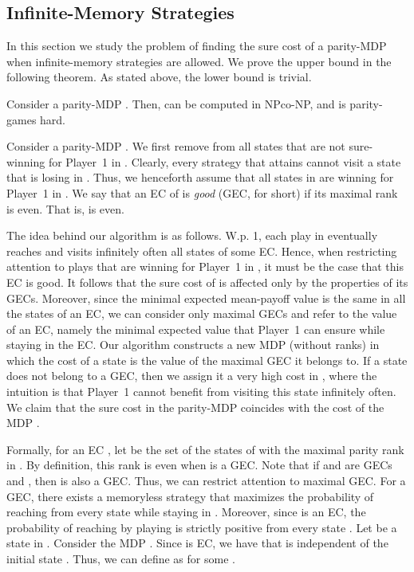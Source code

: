 \documentclass[runningheads,a4paper]{llncs}
\newcommand{\gec}{{GEC}\xspace}
\newcommand{\gecs}{{GECs}\xspace}
\begin{document}
\vspace*{-8pt}
\subsection{Infinite-Memory Strategies}
\label{sec:infinite memory}
In this section we study the problem of finding the sure cost of a parity-MDP when infinite-memory strategies are allowed. 
We prove the upper bound in the following theorem. As stated above, the lower bound is trivial.

\begin{theorem}
\label{thm:parityMDP infinite NP cap co-NP}
Consider a parity-MDP . Then,  can be computed in NPco-NP, and is parity-games hard.
\end{theorem}

 
Consider a parity-MDP .
We first remove from  all states that are not sure-winning for Player~1 in . Clearly, every strategy that attains  cannot visit a state that is losing in  . Thus, we henceforth assume that all states in  are winning for Player~1 in . 
We say that an EC  of  is {\em good} (\gec, for short) if its maximal rank is even. That is,  is even. 

The idea behind our algorithm is as follows. W.p. 1, each play in  eventually reaches and visits infinitely often all states of some EC. Hence, when restricting attention to plays that are winning for Player~1 in , it must be the case that this EC is good. It follows that the sure cost of  is affected only by the properties of its \gecs.
Moreover, since  the minimal expected mean-payoff value is the same in all the states of an EC, we can consider only maximal \gecs and refer to the value of an EC, namely the minimal expected value that Player~1 can ensure while staying in the EC. Our algorithm constructs a new MDP (without ranks)  in which the cost of a state is the value of the maximal \gec it belongs to. If a state does not belong to a \gec, then we assign it a very high cost in , where the intuition is that Player~1 cannot benefit from visiting this state infinitely often. We claim that the sure cost in the parity-MDP   coincides with the cost of the MDP .

Formally, for an EC , let  be the set of the states of  with the maximal parity rank in . By definition, this rank is even when  is a \gec. 
Note that if  and  are \gecs and , then  is also a \gec. Thus, we can restrict attention to maximal \gec.
For a \gec , there exists a memoryless strategy  that maximizes the probability of reaching  from every state  while staying in . Moreover, since  is an EC, the probability of reaching  by playing  is strictly positive from every state . Let  be a state in . Consider the MDP . 
Since  is EC, we have that  is independent of the initial state . Thus, we can define  as  for some .
\end{document}
